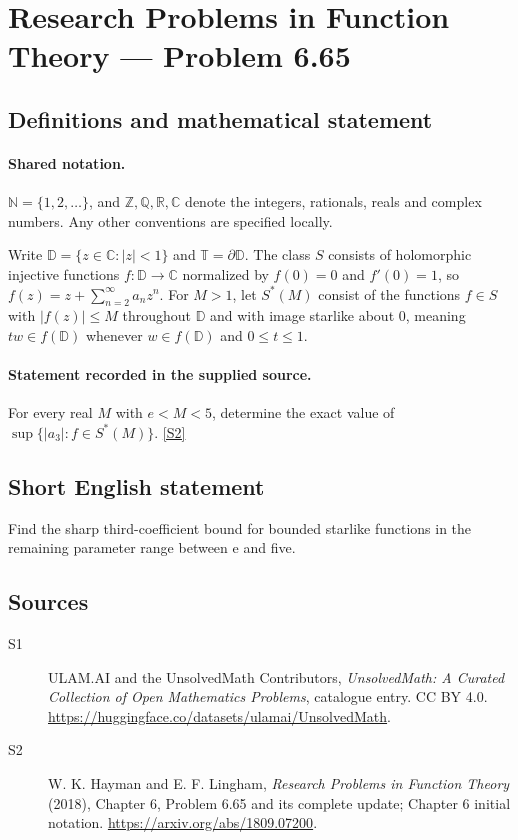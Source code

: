 \documentclass[11pt]{article}
\newcommand{\sref}[2]{\hyperlink{source:#1:#2}{[S#2]}}
\begin{document}
\section{Research Problems in Function Theory — Problem 6.65}\label{statement}

\subsection{Definitions and mathematical statement}

\paragraph{Shared notation.}$\mathbb N=\{1,2,\ldots\}$, and $\mathbb Z,\mathbb Q,\mathbb R,\mathbb C$ denote the integers, rationals, reals and complex numbers. Any other conventions are specified locally.


Write $\mathbb D=\{z\in\mathbb C:|z|<1\}$ and $\mathbb T=\partial\mathbb D$. The class $S$ consists of holomorphic injective functions $f:\mathbb D\to\mathbb C$ normalized by $f(0)=0$ and $f'(0)=1$, so $f(z)=z+\sum_{n=2}^{\infty}a_nz^n$. For $M>1$, let $S^*(M)$ consist of the functions $f\in S$ with $|f(z)|\le M$ throughout $\mathbb D$ and with image starlike about $0$, meaning $tw\in f(\mathbb D)$ whenever $w\in f(\mathbb D)$ and $0\le t\le1$.
\paragraph{Statement recorded in the supplied source.}
For every real $M$ with $e<M<5$, determine the exact value of $\sup\{|a_3|:f\in S^*(M)\}$. \sref{statement}{2}
\subsection{Short English statement}
Find the sharp third-coefficient bound for bounded starlike functions in the remaining parameter range between e and five.
\subsection{Sources}
\begin{description}
\item[\hypertarget{source:statement:1}{S1}] ULAM.AI and the UnsolvedMath Contributors, \emph{UnsolvedMath: A Curated Collection of Open Mathematics Problems}, catalogue entry. CC BY 4.0. \url{https://huggingface.co/datasets/ulamai/UnsolvedMath}.
\item[\hypertarget{source:statement:2}{S2}] W. K. Hayman and E. F. Lingham, \emph{Research Problems in Function Theory} (2018), Chapter 6, Problem 6.65 and its complete update; Chapter 6 initial notation. \url{https://arxiv.org/abs/1809.07200}.
\end{description}
\label{end:statement}
\end{document}
